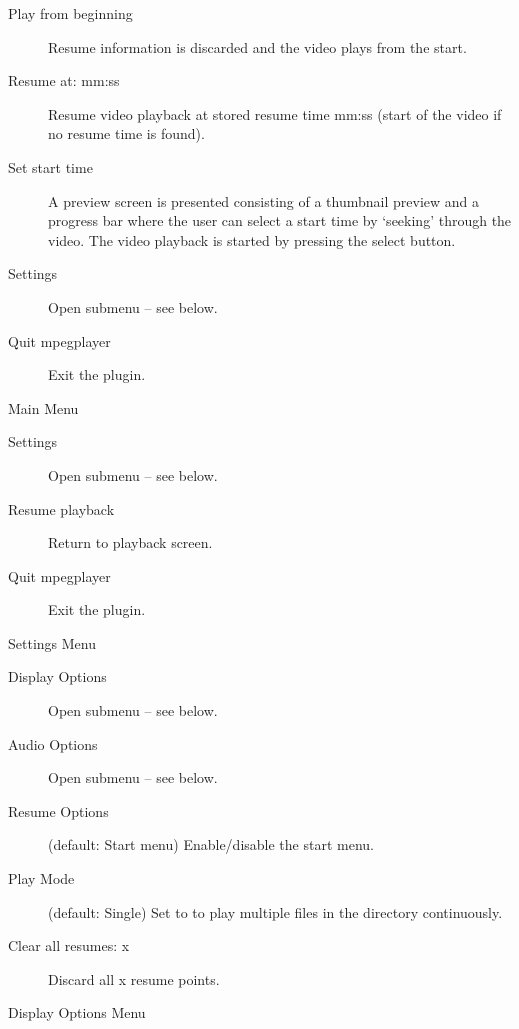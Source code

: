 \begin{description}
\item[Play from beginning] Resume information is discarded and the video plays
    from the start.
\item[Resume at: mm:ss] Resume video playback at stored resume time mm:ss
    (start of the video if no resume time is found).
\item[Set start time] A preview screen is presented consisting of a
    thumbnail preview and a progress bar where the user can select a start time
    by `seeking' through the video. The video playback is started by pressing
    the select button.
\item[Settings] Open  submenu -- see below.
\item[Quit mpegplayer] Exit the plugin.
\end{description}

Main Menu

\begin{description}
\item[Settings] Open  submenu -- see below.
\item[Resume playback] Return to playback screen.
\item[Quit mpegplayer] Exit the plugin.
\end{description}

Settings Menu

\begin{description}
\item[Display Options] Open  submenu -- see below.
\item[Audio Options] Open  submenu -- see below.
\item[Resume Options] (default: Start menu) Enable/disable the start menu.
\item[Play Mode] (default: Single) Set to  to play multiple
     files in the directory continuously.
\item[Clear all resumes: x] Discard all x resume points.
\end{description}

Display Options Menu

